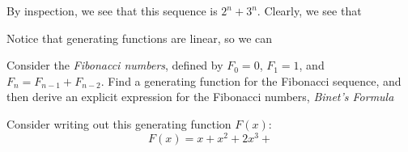 \documentclass[11pt,twosided]{article}
\begin{document}
\begin{solution}
	By inspection, we see that this sequence is $2^n + 3^n$. Clearly, we see that 
\end{solution}
Notice that generating functions are linear, so we can 
\begin{problem}
	Consider the \textit{Fibonacci numbers}, defined by $F_0 = 0$, $F_1 = 1$, and $F_{n} = F_{n-1} + F_{n-2}$. Find a generating function for the Fibonacci sequence, and then derive an explicit expression for the Fibonacci numbers, \textit{Binet's Formula}
\end{problem}

\begin{solution}
	Consider writing out this generating function $F(x)$: 
\[
	F(x) = x + x^2 + 2x^3 +	
\]
\end{solution}
\end{document}
